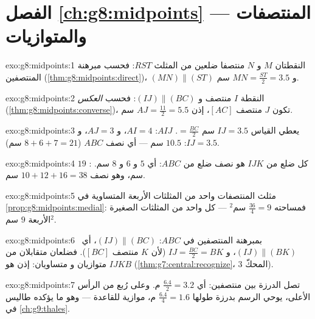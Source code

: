 \section*{الفصل \ref{ch:g8:midpoints} --- المنتصفات والمتوازيات}

\begin{solution}{exo:g8:midpoints:1}
النقطتان $M$ و $N$ منتصفا ضلعين من المثلث $RST$: فحسب
مبرهنة المنتصفين (\cref{thm:g8:midpoints:direct})،
$(MN) \parallel (ST)$ و $MN = \frac{ST}{2} = 3.5$ سم.
\end{solution}

\begin{solution}{exo:g8:midpoints:2}
النقطة $I$ منتصف و $(IJ) \parallel (BC)$: فحسب \emph{العكس}
(\cref{thm:g8:midpoints:converse})، تكون $J$ منتصف $[AC]$،
إذن $AJ = \frac{11}{2} = 5.5$ سم.
\end{solution}

\begin{solution}{exo:g8:midpoints:3}
يعطي القياس $IJ = 3.5$ سم $= \frac{BC}{2}$. 
$AIJ$: $AI = 4$، و $AJ = 3$، و $IJ = 3.5$:  $10.5$ سم --- أي نصف
 $ABC$ ($8 + 6 + 7 = 21$ سم).
\end{solution}

\begin{solution}{exo:g8:midpoints:4}
كل ضلع من $IJK$ هو نصف ضلع من $ABC$: أي $5$ و $6$ و $8$ سم.
: $19$ سم، وهو نصف $10 + 12 + 16 = 38$ سم.
\end{solution}

\begin{solution}{exo:g8:midpoints:5}
مثلث المنتصفات واحد من المثلثات الأربعة المتساوية في
\cref{prop:g8:midpoints:medial}: فمساحته $\frac{36}{4} = 9$ سم$^2$ ---
 كل واحد من المثلثات الصغيرة الأربعة $9$ سم$^2$.
\end{solution}

\begin{solution}{exo:g8:midpoints:6}
بمبرهنة المنتصفين في $ABC$: $(IJ) \parallel (BC)$، أي\
$(IJ) \parallel (BK)$، و $IJ = \frac{BC}{2} = BK$ (لأن $K$
منتصف $[BC]$). فضلعان متقابلان من $IJKB$ متوازيان و
متساويان: إذن هو 
(\cref{thm:g7:central:recognize}، المحكّ 3).
\end{solution}

\begin{solution}{exo:g8:midpoints:7}
تصل الدرزة بين منتصفين: أي $\frac{6.4}{2} = 3.2$ م. وعلى
رُبع من الرأس الأعلى، يوحي الرسم بدرزة طولها
$\frac{6.4}{4} = 1.6$ م، موازية للقاعدة --- وهو ما يؤكده طاليس
في \cref{ch:g9:thales}.
\end{solution}

